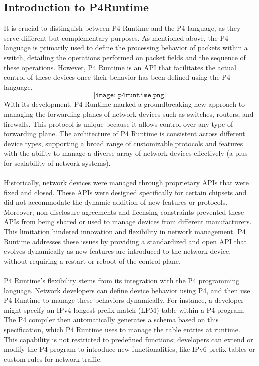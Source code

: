 \subsection{Introduction to P4Runtime}
It is crucial to distinguish between P4 Runtime and the P4 language, as they serve different but complementary purposes. As mentioned above, the P4 language is primarily used to define the processing behavior of packets within a switch, detailing the operations performed on packet fields and the sequence of these operations. However, P4 Runtime is an API that facilitates the actual control of these devices once their behavior has been defined using the P4 language. \\
$$
\texttt{[image: p4runtime.png]}
$$
With its development, P4 Runtime marked a groundbreaking new approach to managing the forwarding planes of network devices such as switches, routers, and firewalls. This protocol is unique because it allows control over any type of forwarding plane. The architecture of P4 Runtime is consistent across different device types, supporting a broad range of customizable protocols and features with the ability to manage a diverse array of network devices effectively (a plus for scalability of network systems). \\
\\
Historically, network devices were managed through proprietary APIs that were fixed and closed. These APIs were designed specifically for certain chipsets and did not accommodate the dynamic addition of new features or protocols. Moreover, non-disclosure agreements and licensing constraints prevented these APIs from being shared or used to manage devices from different manufacturers. This limitation hindered innovation and flexibility in network management. P4 Runtime addresses these issues by providing a standardized and open API that evolves dynamically as new features are introduced to the network device, without requiring a restart or reboot of the control plane.\\
\\
P4 Runtime's flexibility stems from its integration with the P4 programming language. Network developers can define device behavior using P4, and then use P4 Runtime to manage these behaviors dynamically. For instance, a developer might specify an IPv4 longest-prefix-match (LPM) table within a P4 program. The P4 compiler then automatically generates a schema based on this specification, which P4 Runtime uses to manage the table entries at runtime. This capability is not restricted to predefined functions; developers can extend or modify the P4 program to introduce new functionalities, like IPv6 prefix tables or custom rules for network traffic.
